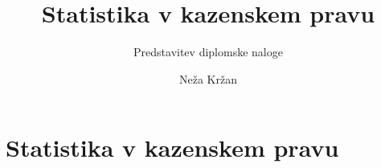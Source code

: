 \documentclass{beamer}
\begin{document}
\title{Statistika v kazenskem pravu}
\subtitle{Predstavitev diplomske naloge}
\author[Neža Kržan]{Neža Kržan}
 
\date[7. september 2023] {}

\subject{Talks}

\begin{frame}
   \titlepage
\end{frame}


\section{Statistika v kazenskem pravu}
\end{document}
